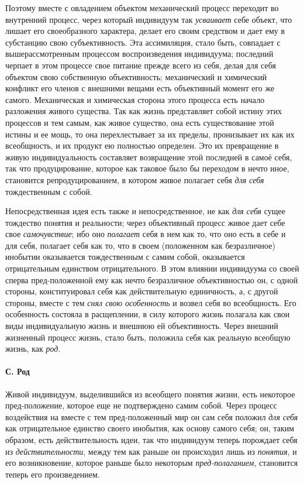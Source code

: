 \documentclass[twoside]{article}
\begin{document}
{{{Поэтому вместе с овладением объектом механический процесс
переходит во внутренний процесс, через который индивидуум так
{\em усваивает} себе
объект, что лишает его своеобразного характера, делает его своим средством
и дает ему в субстанцию свою субъективность. Эта ассимиляция, стало быть,
совпадает с вышерассмотренным процессом воспроизведения индивидуума;
последний черпает в этом процессе свое питание прежде всего из себя,
делая для себя объектом свою собственную объективность;
механический и химический конфликт его членов с внешними вещами есть
объективный момент его же самого. Механическая и химическая сторона этого
процесса есть начало разложения живого существа. Так как жизнь представляет
собой истину этих процессов и тем самым, как живое существо, она есть
существование этой истины и ее мощь, то она перехлестывает за их пределы,
пронизывает их как их всеобщность, и их продукт ею полностью определен. Это
их превращение в живую индивидуальность составляет возвращение этой
последней в самоё себя, так что продуцирование, которое как таковое было бы
переходом в нечто иное, становится репродуцированием, в котором живое
полагает себя {\em для себя}
тождественным с собой.

Непосредственная идея есть также и непосредственное, не как
{\em для себя} сущее
тождество понятия и реальности; через объективный процесс живое дает себе
свое {\em самочувствие};
ибо оно {\em полагает}
себя в нем как то, что оно есть в себе и для себя, полагает
себя как то, что в своем (положенном как безразличное) инобытии оказывается
тождественным с самим собой, оказывается отрицательным единством
отрицательного. В этом влиянии индивидуума со своей сперва пред-положенной
ему как нечто безразличное объективностью он, с одной стороны,
конституировал себя как действительную единичность, а, с другой стороны,
вместе с тем {\em снял свою
особенность} и возвел себя во всеобщность. Его особенность
состояла в расщеплении, в силу которого жизнь полагала как свои виды
индивидуальную жизнь и внешнюю ей объективность. Через внешний жизненный
процесс жизнь, стало быть, положила себя как реальную всеобщую жизнь, как
{\em род}.

\paragraph[С. Род]{С. Род}
Живой индивидуум, выделившийся из всеобщего понятия жизни,
есть некоторое пред-положение, которое еще не подтверждено самим собой.
Через процесс воздействия на вместе с тем пред-положенный мир он сам себя
положил {\em для себя}
как отрицательное единство своего инобытия, как основу самого
себя; он, таким образом, есть действительность идеи, так что индивидуум
теперь порождает себя из
{\em действительности},
между тем как раньше он происходил лишь из
{\em понятия}, и его
возникновение, которое раньше было некоторым
{\em пред-полаганием},
становится теперь его произведением.

}}}
\end{document}
